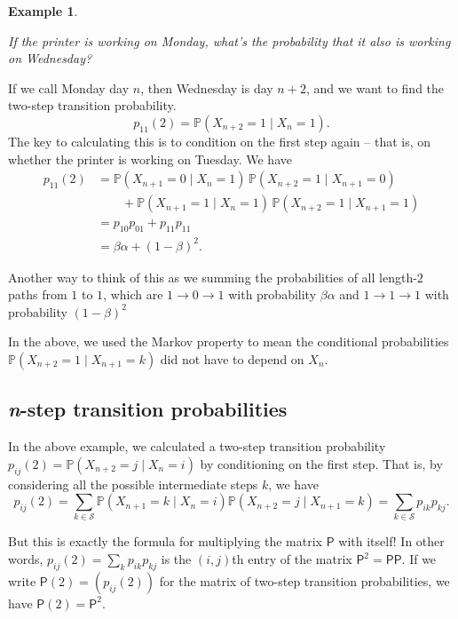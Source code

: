 \documentclass[
  a4paper,
]{article}
\theoremstyle{definition}
\theoremstyle{definition}
\newtheorem{example}{Example}[section]
\theoremstyle{definition}
\theoremstyle{remark}
\begin{document}
\begin{example}
\protect\hypertarget{exm:printer}{}\label{exm:printer}

\emph{If the printer is working on Monday, what's the probability that it also is working on Wednesday?}

If we call Monday day \(n\), then Wednesday is day \(n+2\), and we want to find the two-step transition probability.
\[ p_{11}(2) = \mathbb P (X_{n+2} = 1 \mid X_n = 1) . \]
The key to calculating this is to condition on the first step again -- that is, on whether the printer is working on Tuesday. We have
\begin{align*}
  p_{11}(2) &= \mathbb P (X_{n+1} = 0 \mid X_n = 1)\,\mathbb P (X_{n+2} = 1 \mid X_{n+1} = 0) \\
  &\qquad{} + \mathbb P (X_{n+1} = 1 \mid X_n = 1)\,\mathbb P (X_{n+2} = 1 \mid X_{n+1} = 1) \\
  &= p_{10}p_{01} + p_{11}p_{11} \\
  &= \beta\alpha + (1-\beta)^2 .
\end{align*}

Another way to think of this as we summing the probabilities of all length-\(2\) paths from \(1\) to \(1\), which are \(1\to 0\to 1\) with probability \(\beta\alpha\) and \(1 \to 1 \to 1\) with probability \((1-\beta)^2\)

In the above, we used the Markov property to mean the conditional probabilities \(\mathbb P(X_{n+2} = 1 \mid X_{n+1} = k)\) did not have to depend on \(X_n\).

\end{example}

\hypertarget{n-step}{%
\subsection{\texorpdfstring{\emph{n}-step transition probabilities}{n-step transition probabilities}}\label{n-step}}

In the above example, we calculated a two-step transition probability \(p_{ij}(2) = \mathbb P (X_{n+2} = j \mid X_n = i)\) by conditioning on the first step. That is, by considering all the possible intermediate steps \(k\), we have
\[ p_{ij}(2) = \sum_{k\in\mathcal S} \mathbb P (X_{n+1} = k \mid X_n = i)\mathbb P (X_{n+2} = j \mid X_{n+1} = k) = \sum_{k\in\mathcal S} p_{ik}p_{kj} . \]

But this is exactly the formula for multiplying the matrix \(\mathsf P\) with itself! In other words, \(p_{ij}(2) = \sum_{k} p_{ik}p_{kj}\) is the \((i,j)\)th entry of the matrix \(\mathsf P^2 = \mathsf{PP}\). If we write \(\mathsf P(2) = (p_{ij}(2))\) for the matrix of two-step transition probabilities, we have \(\mathsf P(2) = \mathsf P^2\).
\end{document}
